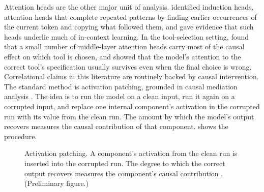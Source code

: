 Attention heads are the other major unit of analysis.
\textcite{olsson2022induction} identified induction heads, attention heads that complete repeated patterns by finding earlier occurrences of the current token and copying what followed them, and gave evidence that such heads underlie much of in-context learning.
In the tool-selection setting, \textcite{wu2026linearly} found that a small number of middle-layer attention heads carry most of the causal effect on which tool is chosen, and \textcite{chen2026looking} showed that the model's attention to the correct tool's specification usually survives even when the final choice is wrong.
\\

Correlational claims in this literature are routinely backed by causal intervention.
The standard method is activation patching, grounded in causal mediation analysis \cite{vig2020causal}.
The idea is to run the model on a clean input, run it again on a corrupted input, and replace one internal component's activation in the corrupted run with its value from the clean run.
The amount by which the model's output recovers measures the causal contribution of that component.
 shows the procedure.

\begin{figure}[htbp]
\centering
{}
\caption{Activation patching. A component's activation from the clean run is inserted into the corrupted run. The degree to which the correct output recovers measures the component's causal contribution \cite{vig2020causal}. (Preliminary figure.)}
\label{fig:patching}
\end{figure}

